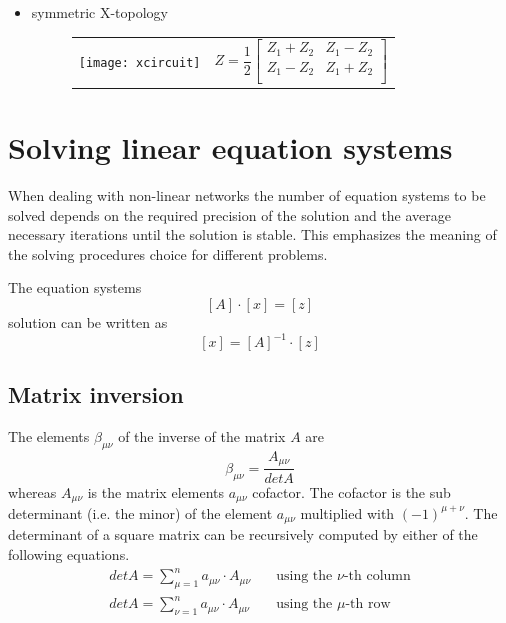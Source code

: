 \begin{itemize}
\item symmetric X-topology

\begin{figure}[ht]
\begin{tabular}{cc}
\begin{minipage}[t]{0.4\linewidth}
\centering
\texttt{[image: xcircuit]}
\end{minipage}
&
\begin{minipage}[t]{0.5\linewidth}
$
Z = \dfrac{1}{2}
\begin{bmatrix}
Z_1 + Z_2 & Z_1 - Z_2\\
Z_1 - Z_2 & Z_1 + Z_2\\
\end{bmatrix}
$
\end{minipage}
\end{tabular}
\end{figure}
\FloatBarrier

\end{itemize}


\section{Solving linear equation systems}
\label{sec:linEQS}

When dealing with non-linear networks the number of equation systems
to be solved depends on the required precision of the solution and the
average necessary iterations until the solution is stable.  This
emphasizes the meaning of the solving procedures choice for different
problems.

\addvspace{12pt}

The equation systems
\begin{equation}
\left[A\right] \cdot \left[x\right] = \left[z\right]
\end{equation}
solution can be written as
\begin{equation}
\left[x\right] = \left[A\right]^{-1} \cdot \left[z\right]
\end{equation}

\subsection{Matrix inversion}

The elements $\beta_{\mu\nu}$ of the inverse of the matrix $A$ are
\begin{equation}
\beta_{\mu\nu} = \frac{A_{\mu\nu}}{det A}
\end{equation}
whereas $A_{\mu\nu}$ is the matrix elements $a_{\mu\nu}$ cofactor.
The cofactor is the sub determinant (i.e. the minor) of the element
$a_{\mu\nu}$ multiplied with $(-1)^{\mu + \nu}$.  The determinant of a
square matrix can be recursively computed by either of the following
equations.
\begin{align}
det A = \sum_{\mu = 1}^{n} a_{\mu\nu}\cdot A_{\mu\nu}
\quad &\text{using the $\nu$-th column}\\
det A = \sum_{\nu = 1}^{n} a_{\mu\nu}\cdot A_{\mu\nu}
\quad &\text{using the $\mu$-th row}
\end{align}

